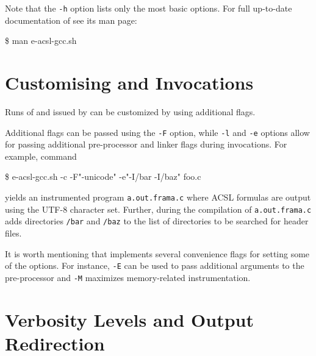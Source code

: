 Note that the \texttt{-h} option lists only the most basic options.
For full up-to-date documentation of \eacslgcc see its man page:

\begin{shell}
    \$ man e-acsl-gcc.sh
\end{shell}


\section{Customising \framac and \gcc Invocations}

Runs of \framac and \gcc issued by \eacslgcc can be customized by using
additional flags.

Additional \framac flags can be passed using the \texttt{-F} option, while
\texttt{-l} and \texttt{-e} options allow for passing additional pre-processor
and linker flags during \gcc invocations.  For example, command

\begin{shell}
 \$ e-acsl-gcc.sh -c -F"-unicode" -e"-I/bar -I/baz" foo.c
\end{shell}

yields an instrumented program \texttt{a.out.frama.c} where ACSL formulas
are output using the UTF-8 character set. Further, during the compilation of
\texttt{a.out.frama.c} \gcc adds directories \texttt{/bar} and
\texttt{/baz} to the list of directories to be searched for header files.

It is worth mentioning that \eacslgcc implements several convenience flags for
setting some of the \framac options. For instance, \texttt{-E} can be used to
pass additional arguments to the \framac pre-processor and \texttt{-M}
maximizes memory-related instrumentation.


\section{Verbosity Levels and Output Redirection}

